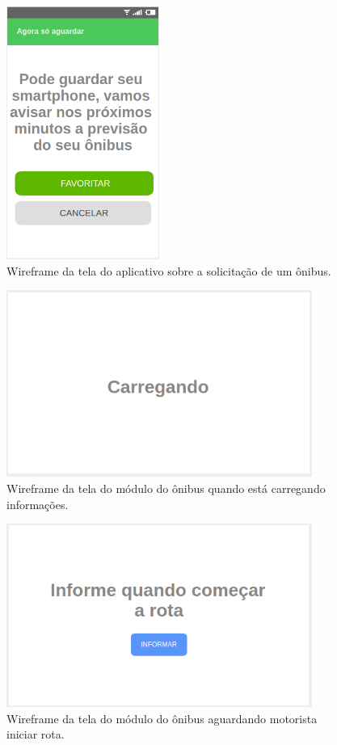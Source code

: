 \documentclass[
	12pt,				%
	oneside,			%
	a4paper,			%
	brazil				%
]{abntex2}
\begin{document}
{\begin{apendicesenv}
\begin{figure}[!h]
\centering
\includegraphics[width=5cm, center]{images/tela-5-acompanhamento-do-onibus.PNG}
\caption{Wireframe da tela do aplicativo sobre a solicitação de um ônibus.}
\label{Rotulo}
\end{figure}

\begin{figure}[!h]
\centering
\includegraphics[width=10cm, center]{images/busmodule-carregando}
\caption{Wireframe da tela do módulo do ônibus quando está carregando informações.}
\label{Rotulo}
\end{figure}

\begin{figure}[!h]
\centering
\includegraphics[width=10cm, center]{images/busmodule-comecar-rota}
\caption{Wireframe da tela do módulo do ônibus aguardando motorista iniciar rota.}
\label{Rotulo}
\end{figure}


\end{apendicesenv}}
\end{document}
